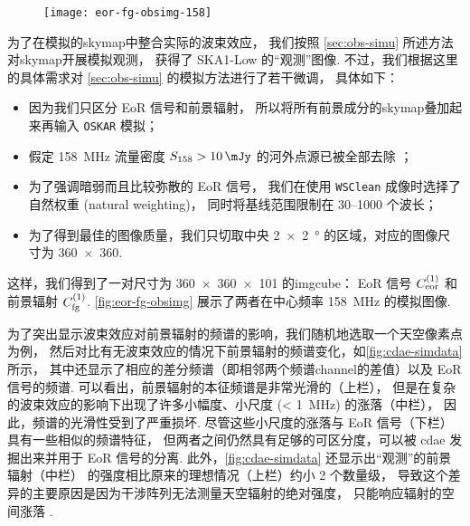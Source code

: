 \begin{figure}[htp]
  \centering
  \texttt{[image: eor-fg-obsimg-158]}
  \label{fig:eor-fg-obsimg}
\end{figure}

为了在模拟的\ac{skymap}中整合实际的波束效应，
我们按照 \autoref{sec:obs-simu} 所述方法对\ac{skymap}开展模拟观测，
获得了 SKA1-Low 的\enquote{观测}图像.
不过，我们根据这里的具体需求对 \autoref{sec:obs-simu} 的模拟方法进行了若干微调，
具体如下：
\begin{itemize}
  \item 因为我们只区分 EoR 信号和前景辐射，
    所以将所有前景成分的\ac{skymap}叠加起来再输入 \texttt{OSKAR} 模拟；
  \item 假定 \SI{158}{\MHz} 流量密度 $S_{158} > \SI{10}{\mJy}$
    的河外点源已被全部去除 \cite{liu2009ps}；
  \item 为了强调暗弱而且比较弥散的 EoR 信号，
    我们在使用 \texttt{WSClean} 成像时选择了自然权重 (natural weighting)，
    同时将基线范围限制在 \numrange{30}{1000} 个波长；
  \item 为了得到最佳的图像质量，我们只切取中央 \SI{2 x 2}{\degree}
    的区域，对应的图像尺寸为 \num{360 x 360}.
\end{itemize}
这样，我们得到了一对尺寸为 \num{360 x 360 x 101} 的\ac{imgcube}：
EoR 信号 $C_{\mathrm{eor}}^{(1)}$ 和前景辐射 $C_{\mathrm{fg}}^{(1)}$.
\autoref{fig:eor-fg-obsimg} 展示了两者在中心频率 \SI{158}{\MHz} 的模拟图像.

为了突出显示波束效应对前景辐射的频谱的影响，我们随机地选取一个天空像素点为例，
然后对比有无波束效应的情况下前景辐射的频谱变化，如\autoref{fig:cdae-simdata} 所示，
其中还显示了相应的差分频谱（即相邻两个频谱\ac{channel}的差值）以及 EoR 信号的频谱.
可以看出，前景辐射的本征频谱是非常光滑的（上栏），
但是在复杂的波束效应的影响下出现了许多小幅度、小尺度 (\SI{< 1}{\MHz}) 的涨落（中栏），
因此，频谱的光滑性受到了严重损坏.
尽管这些小尺度的涨落与 EoR 信号（下栏）具有一些相似的频谱特征，
但两者之间仍然具有足够的可区分度，可以被 \ac{cdae} 发掘出来并用于 EoR 信号的分离.
此外，\autoref{fig:cdae-simdata} 还显示出\enquote{观测}的前景辐射（中栏）
的强度相比原来的理想情况（上栏）约小 2 个数量级，
导致这个差异的主要原因是因为干涉阵列无法测量天空辐射的绝对强度，
只能响应辐射的空间涨落 \cite{braun1985}.

